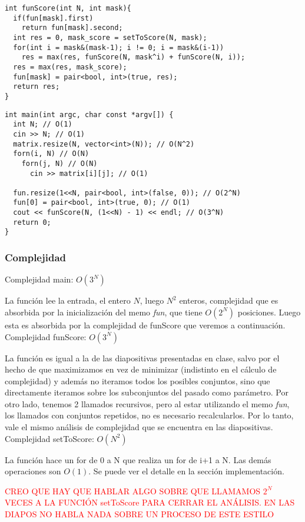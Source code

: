 \begin{verbatim}
int funScore(int N, int mask){
  if(fun[mask].first)
    return fun[mask].second;
  int res = 0, mask_score = setToScore(N, mask);
  for(int i = mask&(mask-1); i != 0; i = mask&(i-1))
    res = max(res, funScore(N, mask^i) + funScore(N, i));
  res = max(res, mask_score);
  fun[mask] = pair<bool, int>(true, res);
  return res;
}
\end{verbatim}

\begin{verbatim}
int main(int argc, char const *argv[]) {
  int N; // O(1)
  cin >> N; // O(1)
  matrix.resize(N, vector<int>(N)); // O(N^2)
  forn(i, N) // O(N)
    forn(j, N) // O(N)
      cin >> matrix[i][j]; // O(1)

  fun.resize(1<<N, pair<bool, int>(false, 0)); // O(2^N)
  fun[0] = pair<bool, int>(true, 0); // O(1)
  cout << funScore(N, (1<<N) - 1) << endl; // O(3^N)
  return 0;
}
\end{verbatim}

\subsubsection{Complejidad}

Complejidad main: $O(3^N)$

La funci\'on lee la entrada, el entero $N$, luego $N^2$ enteros, complejidad que es absorbida por la inicializaci\'on del memo \textit{fun}, que tiene $O(2^N)$ posiciones. Luego esta es absorbida por la complejidad de funScore que veremos a continuaci\'on. \\

Complejidad funScore: $O(3^N)$

La funci\'on es igual a la de las diapositivas presentadas en clase, salvo por el hecho de que maximizamos en vez de minimizar (indistinto en el c\'alculo de complejidad) y adem\'as no iteramos todos los posibles conjuntos, sino que directamente iteramos sobre los subconjuntos del pasado como par\'ametro. Por otro lado, tenemos 2 llamados recursivos, pero al estar utilizando el memo \textit{fun}, los llamados con conjuntos repetidos, no es necesario recalcularlos. Por lo tanto, vale el mismo an\'alisis de complejidad que se encuentra en las diapositivas.\\

Complejidad setToScore: $O(N^2)$

La funci\'on hace un for de 0 a N que realiza un for de i+1 a N. Las dem\'as operaciones son $O(1)$. Se puede ver el detalle en la secci\'on implementaci\'on.

\textcolor{red}{CREO QUE HAY QUE HABLAR ALGO SOBRE QUE LLAMAMOS $2^N$ VECES A LA FUNCI\'ON setToScore PARA CERRAR EL AN\'ALISIS. EN LAS DIAPOS NO HABLA NADA SOBRE UN PROCESO DE ESTE ESTILO}